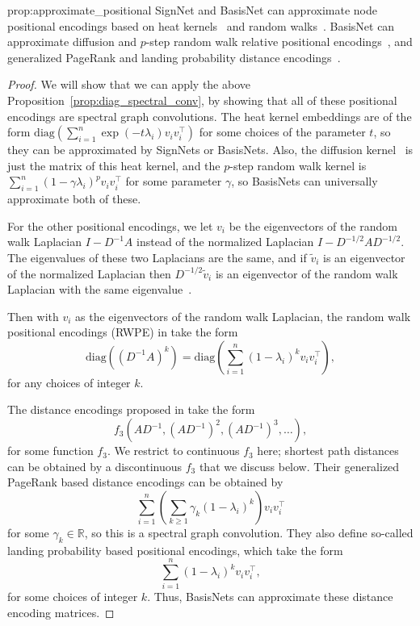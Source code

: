 \documentclass{article} \usepackage{iclr2023_conference,times}
\newcommand{\RR}{\mathbb R}
\newcommand{\mrm}[1]{\mathrm{#1}}
\begin{document}
\begin{repproposition}{prop:approximate_positional}
    SignNet and BasisNet can approximate node positional encodings based on heat kernels~\citep{feldman2022weisfeiler} and random walks~\citep{dwivedi2022graph}. BasisNet can approximate diffusion and $p$-step random walk relative positional encodings~\citep{mialon2021graphit}, and generalized PageRank and landing probability distance encodings~\citep{li2020distance}.
\end{repproposition}
\begin{proof}
    We will show that we can apply the above Proposition~\ref{prop:diag_spectral_conv}, by showing that all of these positional encodings are spectral graph convolutions. The heat kernel embeddings are of the form $\mrm{diag}\left(\sum_{i=1}^n \exp(-t\lambda_i) v_i v_i^\top \right)$ for some choices of the parameter $t$, so they can be approximated by SignNets or BasisNets. Also, the diffusion kernel~\citep{mialon2021graphit} is just the matrix of this heat kernel, and the $p$-step random walk kernel is $\sum_{i=1}^n (1-\gamma \lambda_i)^p v_i v_i^\top$ for some parameter $\gamma$, so BasisNets can universally approximate both of these.

    For the other positional encodings, we let $v_i$ be the eigenvectors of the random walk Laplacian $I - D^{-1}A$ instead of the normalized Laplacian $I - D^{-1/2}AD^{-1/2}$. The eigenvalues of these two Laplacians are the same, and if $\tilde v_i$ is an eigenvector of the normalized Laplacian then $D^{-1/2} \tilde v_i$ is an eigenvector of the random walk Laplacian with the same eigenvalue~\citep{von2007tutorial}.

    Then with $v_i$ as the eigenvectors of the random walk Laplacian, the random walk positional encodings (RWPE) in \cite{dwivedi2022graph} take the form 
    \begin{equation}
        \mrm{diag}\left((D^{-1}A)^k\right) = \mrm{diag}\left(\sum_{i=1}^n (1-\lambda_i)^k v_i v_i^\top \right),
    \end{equation}
    for any choices of integer $k$.

    The distance encodings proposed in \cite{li2020distance} take the form
    \begin{equation}
        f_3(AD^{-1}, (AD^{-1})^2, (AD^{-1})^3, \ldots),
    \end{equation}
    for some function $f_3$. We restrict to continuous $f_3$ here; shortest path distances can be obtained by a discontinuous $f_3$ that we discuss below. Their generalized PageRank based distance encodings can be obtained by 
    \begin{equation}
        \sum_{i=1}^n \left(\sum_{k \geq 1} \gamma_k  (1-\lambda_i)^k\right) v_i v_i^\top
    \end{equation}
    for some $\gamma_k \in \RR$, so this is a spectral graph convolution. They also define so-called landing probability based positional encodings, which take the form
    \begin{equation}
        \sum_{i=1}^n (1-\lambda_i)^k v_i v_i^\top,
    \end{equation}
    for some choices of integer $k$. Thus, BasisNets can approximate these distance encoding matrices. 
\end{proof}
\end{document}
